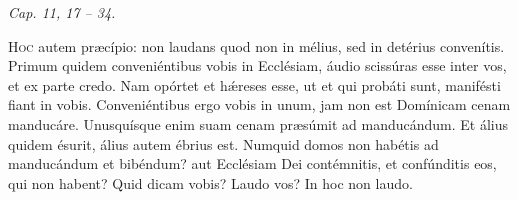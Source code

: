 
{\hfill \textit{Cap. 11, 17 – 34.}}

\lettrine{H}{oc} autem præcípio: non laudans quod non in mélius, sed in detérius convenítis.
Primum quidem conveniéntibus vobis in Ecclésiam, áudio scissúras esse inter vos, et ex parte credo.
Nam opórtet et hǽreses esse, ut et qui probáti sunt, manifésti fiant in vobis.
Conveniéntibus ergo vobis in unum, jam non est Domínicam cenam manducáre.
Unus\-quísque enim suam cenam præsúmit ad manducándum. Et álius quidem ésurit, álius autem ébrius est.
Numquid domos non habétis ad manducándum et bibéndum? aut Ecclésiam Dei contémnitis, et confúnditis eos, qui non habent? Quid dicam vobis? Laudo vos? In hoc non laudo.